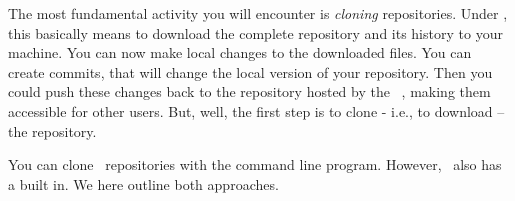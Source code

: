 %
%
The most fundamental activity you will encounter is \emph{cloning} repositories.
Under \git, this basically means to download the complete repository and its history to your machine.
You can now make local changes to the downloaded files.
You can create commits, that will change the local version of your repository.
Then you could push these changes back to the repository hosted by the \git\ , making them accessible for other users.
But, well, the first step is to clone - i.e., to download -- the repository.

You can clone \git\ repositories with the command line   program.
However, \pycharm\ also has a \git {} built in.
We here outline both approaches.%
%
%
%
\endhsection%
